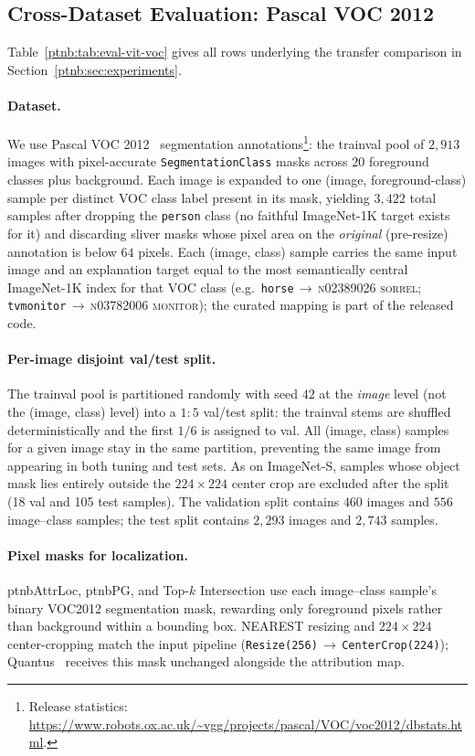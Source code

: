 \subsection{Cross-Dataset Evaluation: Pascal VOC 2012}\label{ptnb:app:voc-cross-data}\label{app:voc-cross-data}
Table~\ref{ptnb:tab:eval-vit-voc} gives all rows underlying the transfer comparison in Section~\ref{ptnb:sec:experiments}.

\paragraph{Dataset.}
We use Pascal VOC 2012~\parencite{Everingham2010voc} segmentation annotations\footnote{Release statistics: \url{https://www.robots.ox.ac.uk/~vgg/projects/pascal/VOC/voc2012/dbstats.html}.}: the trainval pool of
$2{,}913$ images with pixel-accurate \texttt{Seg\-mentationClass} masks across $20$ foreground
classes plus background. Each image is expanded to one (image, foreground-class) sample per
distinct VOC class label present in its mask, yielding $3{,}422$ total samples after dropping the
\texttt{person} class (no faithful ImageNet-1K target exists for it) and discarding sliver masks
whose pixel area on the \emph{original} (pre-resize) annotation is below $64$ pixels. Each (image,
class) sample carries the same input image and an explanation target equal to the most semantically
central ImageNet-1K index for that VOC class (e.g.\ \texttt{horse}$\,\to\,$\textsc{n02389026
sorrel}; \texttt{tvmonitor}$\,\to\,$\textsc{n03782006 monitor}); the curated mapping is part of the
released code.

\paragraph{Per-image disjoint val/test split.} The trainval pool is partitioned randomly with seed $42$ at the \emph{image} level (not the (image,
class) level) into a $1{:}5$ val/test split: the trainval stems are shuffled deterministically and
the first $1/6$ is assigned to val. All (image, class) samples for a given image stay in the same
partition, preventing the same image from appearing in both tuning and test sets. As on
ImageNet-S, samples whose object mask lies entirely outside the $224{\times}224$ center crop are
excluded after the split (18 val and 105 test samples). The validation split contains $460$ images and $556$ image--class samples; the test split contains $2{,}293$ images and $2{,}743$ samples.

\paragraph{Pixel masks for localization.} \ac{ptnbAttrLoc}, \ac{ptnbPG}, and Top-$k$ Intersection use each image--class sample's binary VOC2012 segmentation mask, rewarding only foreground pixels rather than background within a bounding box. NEAREST resizing and $224{\times}224$ center-cropping match the input pipeline (\texttt{Resize(256)$\,\to\,$CenterCrop(224)}); Quantus~\parencite{Hedstrom2023} receives this mask unchanged alongside the attribution map.

